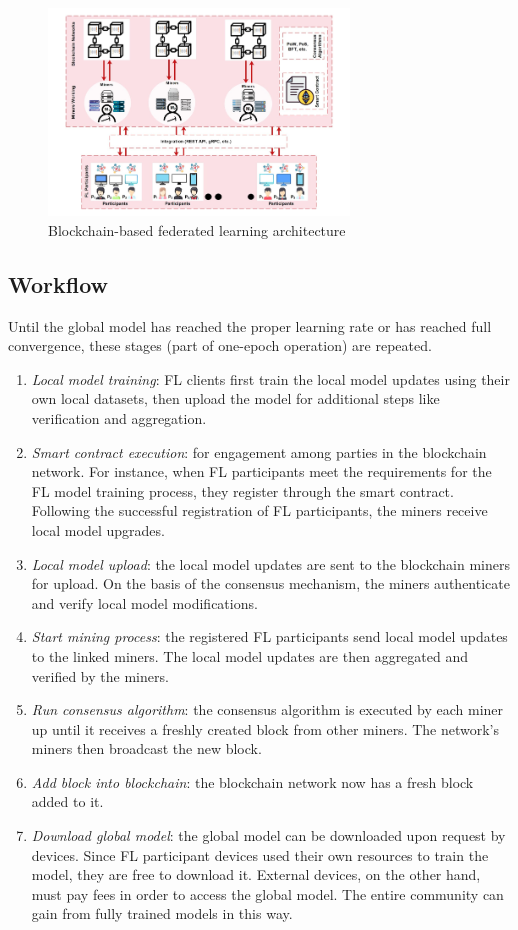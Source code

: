 \documentclass{article}
\begin{document}
\begin{figure}[!ht]
    \centering
    \includegraphics[width=8cm]{assets/blockchain-FL-architecture.png}
    \caption{Blockchain-based federated learning architecture}
    \label{ Structure FL}
\end{figure}

\subsection{Workflow}

Until the global model has reached the proper learning rate or has reached full convergence, these stages (part of one-epoch operation) are repeated.

\begin{enumerate}
\item \textit{Local model training}: FL clients first train the local model updates using their own local datasets, then upload the model for additional steps like verification and aggregation.
\item \textit{Smart contract execution}: for engagement among parties in the blockchain network. For instance, when FL participants meet the requirements for the FL model training process, they register through the smart contract. Following the successful registration of FL participants, the miners receive local model upgrades.
\item \textit{Local model upload}: the local model updates are sent to the blockchain miners for upload. On the basis of the consensus mechanism, the miners authenticate and verify local model modifications.
\item \textit{Start mining process}: the registered FL participants send local model updates to the linked miners. The local model updates are then aggregated and verified by the miners.
\item \textit{Run consensus algorithm}: the consensus algorithm is executed by each miner up until it receives a freshly created block from other miners. The network's miners then broadcast the new block.
\item \textit{Add block into blockchain}: the blockchain network now has a fresh block added to it.
\item \textit{Download global model}: the global model can be downloaded upon request by devices. Since FL participant devices used their own resources to train the model, they are free to download it. External devices, on the other hand, must pay fees in order to access the global model. The entire community can gain from fully trained models in this way.
\end{enumerate}
\end{document}
